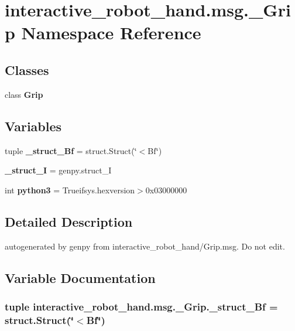\section{interactive\-\_\-robot\-\_\-hand.\-msg.\-\_\-\-Grip Namespace Reference}
\label{namespaceinteractive__robot__hand_1_1msg_1_1__Grip}
\subsection*{Classes}
\begin{DoxyCompactItemize}
\item 
class {\bf Grip}
\end{DoxyCompactItemize}
\subsection*{Variables}
\begin{DoxyCompactItemize}
\item 
tuple {\bf \-\_\-struct\-\_\-\-Bf} = struct.\-Struct(\char`\"{}$<$Bf\char`\"{})
\item 
{\bf \-\_\-struct\-\_\-\-I} = genpy.\-struct\-\_\-\-I
\item 
int {\bf python3} = Trueifsys.\-hexversion$>$0x03000000
\end{DoxyCompactItemize}


\subsection{Detailed Description}
\begin{DoxyVerb}autogenerated by genpy from interactive_robot_hand/Grip.msg. Do not edit.\end{DoxyVerb}
 

\subsection{Variable Documentation}
\subsubsection[{\-\_\-struct\-\_\-\-Bf}]{\setlength{\rightskip}{0pt plus 5cm}tuple interactive\-\_\-robot\-\_\-hand.\-msg.\-\_\-\-Grip.\-\_\-struct\-\_\-\-Bf = struct.\-Struct(\char`\"{}$<$Bf\char`\"{})}\label{namespaceinteractive__robot__hand_1_1msg_1_1__Grip_a37a2d37413e1547fcdf43a3341488109}


